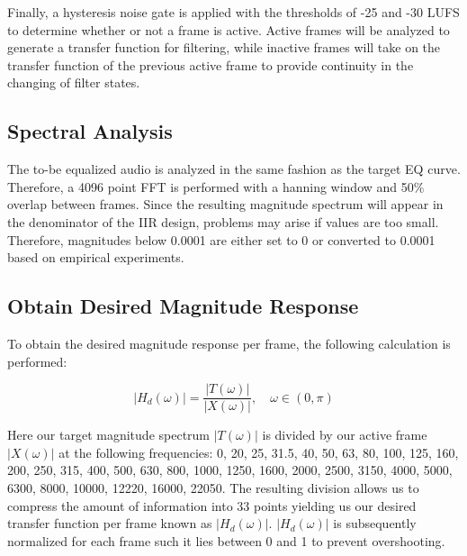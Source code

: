 \documentclass{article}
\begin{document}
Finally, a hysteresis noise gate is applied with the thresholds of -25 and -30 LUFS to determine whether or not a frame is active.  Active frames will be analyzed to generate a transfer function for filtering, while inactive frames will take on the transfer function of the previous active frame to provide continuity in the changing of filter states.

\subsection{Spectral Analysis}
\label{subsec:Spectral Analysis}

The to-be equalized audio is analyzed in the same fashion as the target EQ curve.  Therefore, a 4096 point FFT is performed with a hanning window and 50\% overlap between frames.  Since the resulting magnitude spectrum will appear in the denominator of the IIR design, problems may arise if values are too small.  Therefore, magnitudes below 0.0001 are either set to 0 or converted to 0.0001 based on empirical experiments.

\subsection{Obtain Desired Magnitude Response}
\label{subsec:Obtain Desired Magnitude Response}

To obtain the desired magnitude response per frame, the following calculation is performed:

\begin{equation}
\label{eq:targetmag}
|H_d(\omega)| = \frac{|T(\omega)|}{|X(\omega)|}, \quad \omega \in (0,\pi)
\end{equation}

Here our target magnitude spectrum $|T(\omega)|$ is divided by our active frame $|X(\omega)|$ at the following frequencies: 0, 20, 25, 31.5, 40, 50, 63, 80, 100, 125, 160, 200, 250, 315, 400, 500, 630, 800, 1000, 1250, 1600, 2000, 2500, 3150, 4000, 5000, 6300, 8000, 10000, 12220, 16000, 22050.  The resulting division allows us to compress the amount of information into 33 points yielding us our desired transfer function per frame known as $|H_d(\omega)|$.  $|H_d(\omega)|$ is subsequently normalized for each frame such it lies between 0 and 1 to prevent overshooting.
\end{document}
